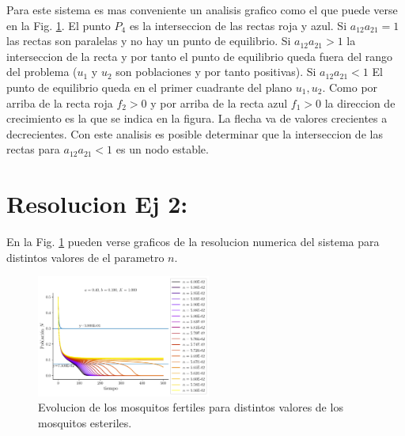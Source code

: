 \documentclass[twocolumn,aps,prl]{revtex4-1}
\begin{document}

Para este sistema es mas conveniente un analisis grafico como el que puede verse en la Fig. \ref{fig:mosquitos}. El punto $P_4$ es la interseccion de las rectas roja y azul. Si $a_{12} a_{21} = 1$ las rectas son paralelas y no hay un punto de equilibrio. Si $a_{12} a_{21} > 1$ la interseccion de la recta y por tanto el punto de equilibrio queda fuera del rango del problema ($u_1$ y $u_2$ son poblaciones y por tanto positivas). Si $a_{12} a_{21} < 1$ El punto de equilibrio queda en el primer cuadrante del plano $u_1, u_2$. Como por arriba de la recta roja $f_2>0$ y por arriba de la recta azul $f_1>0$ la direccion de crecimiento es la que se indica en la figura. La flecha va de valores crecientes a decrecientes. Con este analisis es posible determinar que la interseccion de las rectas para $a_{12} a_{21} < 1$ es un nodo estable.

% 

\section{Resolucion Ej 2:}

En la Fig. \ref{fig:mosquitos} pueden verse graficos de la resolucion numerica del sistema para distintos valores de el parametro $n$.

\begin{figure}
    \centering
    \includegraphics[width=0.51\textwidth]{figuras/ex5.pdf}
    \caption{Evolucion de los mosquitos fertiles para distintos valores de los mosquitos esteriles.}
    \label{fig:mosquitos}
\end{figure}

% 
%                                 
% 
\end{document}
